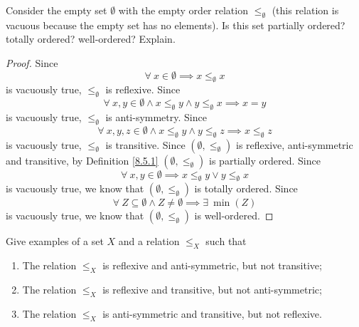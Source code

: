 \exercisesection

\begin{exercise}\label{ex 8.5.1}
    Consider the empty set \(\emptyset\) with the empty order relation \(\leq_\emptyset\)
    (this relation is vacuous because the empty set has no elements).
    Is this set partially ordered? totally ordered? well-ordered? Explain.
\end{exercise}

\begin{proof}
    Since
    \[
        \forall\ x \in \emptyset \implies x \leq_{\emptyset} x
    \]
    is vacuously true, \(\leq_{\emptyset}\) is reflexive.
    Since
    \[
        \forall\ x, y \in \emptyset \land x \leq_{\emptyset} y \land y \leq_{\emptyset} x \implies x = y
    \]
    is vacuously true, \(\leq_{\emptyset}\) is anti-symmetry.
    Since
    \[
        \forall\ x, y, z \in \emptyset \land x \leq_{\emptyset} y \land y \leq_{\emptyset} z \implies x \leq_{\emptyset} z
    \]
    is vacuously true, \(\leq_{\emptyset}\) is transitive.
    Since \((\emptyset, \leq_{\emptyset})\) is reflexive, anti-symmetric and transitive, by Definition \ref{8.5.1} \((\emptyset, \leq_{\emptyset})\) is partially ordered.
    Since
    \[
        \forall\ x, y \in \emptyset \implies x \leq_{\emptyset} y \lor y \leq_{\emptyset} x
    \]
    is vacuously true, we know that \((\emptyset, \leq_{\emptyset})\) is totally ordered.
    Since
    \[
        \forall\ Z \subseteq \emptyset \land Z \neq \emptyset \implies \exists\ \min(Z)
    \]
    is vacuously true, we know that \((\emptyset, \leq_{\emptyset})\) is well-ordered.
\end{proof}

\begin{exercise}\label{ex 8.5.2}
    Give examples of a set \(X\) and a relation \(\leq_X\) such that
    \begin{enumerate}
        \item The relation \(\leq_X\) is reflexive and anti-symmetric, but not transitive;
        \item The relation \(\leq_X\) is reflexive and transitive, but not anti-symmetric;
        \item The relation \(\leq_X\) is anti-symmetric and transitive, but not reflexive.
    \end{enumerate}
\end{exercise}

